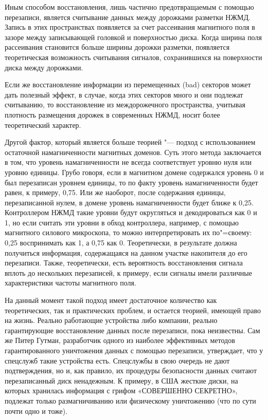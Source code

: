 \documentclass[10pt, a5paper]{article}
\begin{document}
Иным способом восстановления, лишь частично предотвращаемым с помощью перезаписи, является считывание данных между дорожками разметки НЖМД. Запись в этих пространствах появляется за счет рассеивания магнитного поля в зазоре между записывающей головкой и поверхностью диска. Когда ширина поля рассеивания становится больше ширины дорожки разметки, появляется теоретическая возможность считывания сигналов, сохранившихся на поверхности диска между дорожками.

Если же восстановление информации из перемещенных (bad) секторов может дать полезный эффект, в случае, когда этих секторов много и они подлежат считыванию, то восстановление из междорожечного пространства, учитывая плотность размещения дорожек в современных НЖМД, носит более теоретический характер.

Другой фактор, который является больше теорией "--- подход с использованием остаточной намагниченности магнитных доменов. Суть этого метода заключается в том, что уровень намагниченности не всегда соответствует уровню нуля или уровню единицы. Грубо говоря, если в магнитном домене содержался уровень 0 и был перезаписан уровнем единицы, то по факту уровень намагниченности будет равен, к примеру, 0,75. Или же наоборот, после содержания единицы, перезаписанной нулем, в домене уровень намагниченности будет ближе к 0,25. Контроллером НЖМД такие уровни будут округляться и декодироваться как 0 и 1, но если считать эти уровни в обход контроллера, например, с помощью магнитного силового микроскопа, то можно интерпретировать их по"=своему: 0,25 воспринимать как 1, а 0,75 как 0. Теоретически, в результате должна получиться информация, содержащаяся на данном участке накопителя до его перезаписи. Также, теоретически, есть вероятность восстановления сигнала вплоть до нескольких перезаписей, к примеру, если сигналы имели различные характеристики частоты магнитного поля.

На данный момент такой подход имеет достаточное количество как теоретических, так и практических проблем, и остается теорией, имеющей право на жизнь. Реально работающие устройства либо компании, реально гарантирующие восстановление данных после перезаписи, пока неизвестны. Сам же Питер Гутман, разработчик одного из наиболее эффективных методов гарантированного уничтожения данных с помощью перезаписи, утверждает, что у спецслужб такие устройства есть. Спецслужбы в свою очередь не дают подтверждения, но и, как правило, их процедуры безопасности данных считают перезаписанный диск ненадежным. К примеру, в США жесткие диски, на которых хранилась информация с грифом «СОВЕРШЕННО СЕКРЕТНО», подлежат только размагничиванию или физическому уничтожению (что по сути почти одно и тоже).
\end{document}
